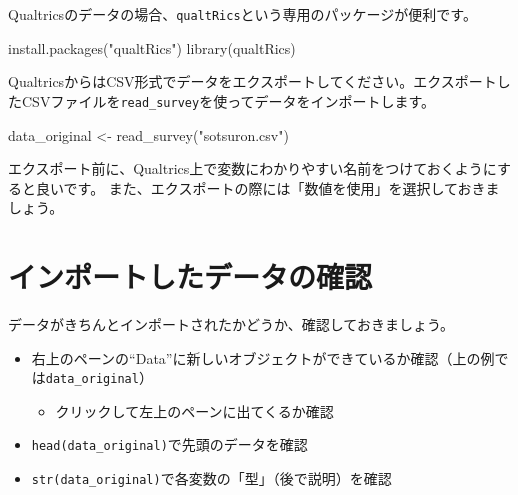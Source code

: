 \documentclass[
]{book}
\newenvironment{Shaded}{\begin{snugshade}}{\end{snugshade}}
\newcommand{\FunctionTok}[1]{\textcolor[rgb]{0.00,0.00,0.00}{#1}}
\newcommand{\NormalTok}[1]{#1}
\newcommand{\OtherTok}[1]{\textcolor[rgb]{0.56,0.35,0.01}{#1}}
\newcommand{\StringTok}[1]{\textcolor[rgb]{0.31,0.60,0.02}{#1}}
\providecommand{\tightlist}{%
  \setlength{\itemsep}{0pt}\setlength{\parskip}{0pt}}
\begin{document}
Qualtricsのデータの場合、\texttt{qualtRics}という専用のパッケージが便利です。

\begin{Shaded}
\begin{Highlighting}[]
\FunctionTok{install.packages}\NormalTok{(}\StringTok{"qualtRics"}\NormalTok{)}
\FunctionTok{library}\NormalTok{(qualtRics)}
\end{Highlighting}
\end{Shaded}

QualtricsからはCSV形式でデータをエクスポートしてください。エクスポートしたCSVファイルを\texttt{read\_survey}を使ってデータをインポートします。

\begin{Shaded}
\begin{Highlighting}[]
\NormalTok{data\_original }\OtherTok{\textless{}{-}} \FunctionTok{read\_survey}\NormalTok{(}\StringTok{"sotsuron.csv"}\NormalTok{)}
\end{Highlighting}
\end{Shaded}

エクスポート前に、Qualtrics上で変数にわかりやすい名前をつけておくようにすると良いです。
また、エクスポートの際には「数値を使用」を選択しておきましょう。

\hypertarget{ux30a4ux30f3ux30ddux30fcux30c8ux3057ux305fux30c7ux30fcux30bfux306eux78baux8a8d}{%
\section{インポートしたデータの確認}\label{ux30a4ux30f3ux30ddux30fcux30c8ux3057ux305fux30c7ux30fcux30bfux306eux78baux8a8d}}

データがきちんとインポートされたかどうか、確認しておきましょう。

\begin{itemize}
\tightlist
\item
  右上のペーンの``Data''に新しいオブジェクトができているか確認（上の例では\texttt{data\_original}）

  \begin{itemize}
  \tightlist
  \item
    クリックして左上のペーンに出てくるか確認
  \end{itemize}
\item
  \texttt{head(data\_original)}で先頭のデータを確認
\item
  \texttt{str(data\_original)}で各変数の「型」（後で説明）を確認
\end{itemize}
\end{document}
